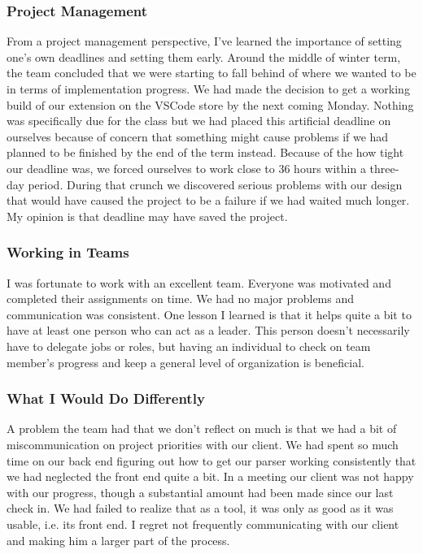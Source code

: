 \documentclass[letterpaper,10pt,titlepage,draftclsnofoot,onecolumn,onesided] {IEEEtran}
\begin{document}
\subsubsection{Project Management}
From a project management perspective, I've learned the importance of setting one's own deadlines and setting them early. 
Around the middle of winter term, the team concluded that we were starting to fall behind of where we wanted to be in terms of implementation progress. 
We had made the decision to get a working build of our extension on the VSCode store by the next coming Monday. 
Nothing was specifically due for the class but we had placed this artificial deadline on ourselves because of concern that something might cause problems if we had planned to be finished by the end of the term instead. 
Because of the how tight our deadline was, we forced ourselves to work close to 36 hours within a three-day period. 
During that crunch we discovered serious problems with our design that would have caused the project to be a failure if we had waited much longer.
My opinion is that deadline may have saved the project.\\

\subsubsection{Working in Teams}
I was fortunate to work with an excellent team. 
Everyone was motivated and completed their assignments on time. 
We had no major problems and communication was consistent. 
One lesson I learned is that it helps quite a bit to have at least one person who can act as a leader. 
This person doesn't necessarily have to delegate jobs or roles, but having an individual to check on team member's progress and keep a general level of organization is beneficial. \\

 
\subsubsection{What I Would Do Differently}
A problem the team had that we don't reflect on much is that we had a bit of miscommunication on project priorities with our client. 
We had spent so much time on our back end figuring out how to get our parser working consistently that we had neglected the front end quite a bit. 
In a meeting our client was not happy with our progress, though a substantial amount had been made since our last check in. 
We had failed to realize that as a tool, it was only as good as it was usable, i.e. its front end. 
I regret not frequently communicating with our client and making him a larger part of the process.\\
\end{document}
